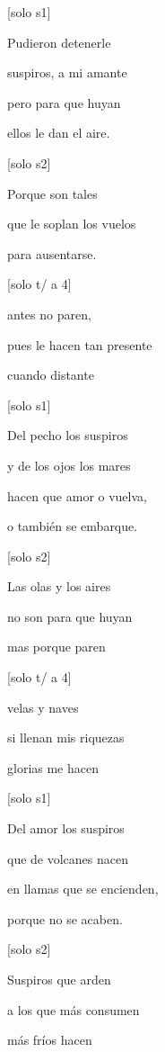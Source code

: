 \centering
\Large{

{[}solo s1{]}

Pudieron detenerle

suspiros, a mi amante

pero para que huyan

ellos le dan el aire.
\vspace{2\baselineskip}

{[}solo s2{]}

Porque son tales

que le soplan los vuelos

para ausentarse.
\vspace{2\baselineskip}

{[}solo t/ a 4{]}

antes no paren,

pues le hacen tan presente

cuando distante
\vspace{2\baselineskip}

{[}solo s1{]}

Del pecho los suspiros

y de los ojos los mares

hacen que amor o vuelva,

o también se embarque.
\vspace{2\baselineskip}

{[}solo s2{]}

Las olas y los aires

no son para que huyan

mas porque paren
\vspace{2\baselineskip}

{[}solo t/ a 4{]}

velas y naves

si llenan mis riquezas

glorias me hacen
\vspace{2\baselineskip}

{[}solo s1{]}

Del amor los suspiros

que de volcanes nacen

en llamas que se encienden,

porque no se acaben.
\vspace{2\baselineskip}

 {[}solo s2{]}

Suspiros que arden

a los que más consumen

más fríos hacen
\vspace{2\baselineskip}

}
